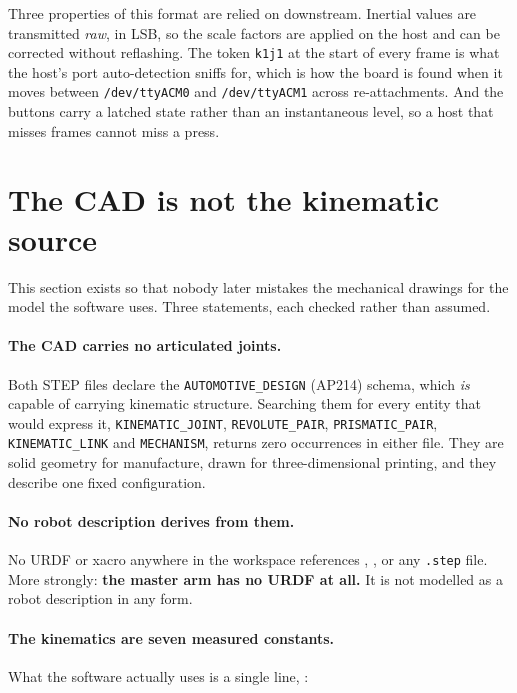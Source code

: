 Three properties of this format are relied on downstream. Inertial values are
transmitted \emph{raw}, in LSB, so the scale factors are applied on the host
and can be corrected without reflashing. The token \texttt{k1j1} at the start
of every frame is what the host's port auto-detection sniffs for, which is how
the board is found when it moves between \texttt{/dev/ttyACM0} and
\texttt{/dev/ttyACM1} across re-attachments. And the buttons carry a latched
state rather than an instantaneous level, so a host that misses frames cannot
miss a press.


\section{The CAD is not the kinematic source}
\label{sec:cad-not-kinematic}

This section exists so that nobody later mistakes the mechanical drawings for
the model the software uses. Three statements, each checked rather than
assumed.

\paragraph{The CAD carries no articulated joints.} Both STEP files declare the
\texttt{AUTOMOTIVE\_DESIGN} (AP214) schema, which \emph{is} capable of
carrying kinematic structure. Searching them for every entity that would
express it, \texttt{KINEMATIC\_JOINT}, \texttt{REVOLUTE\_PAIR},
\texttt{PRISMATIC\_PAIR}, \texttt{KINEMATIC\_LINK} and \texttt{MECHANISM},
returns zero occurrences in either file. They are solid geometry for
manufacture, drawn for three-dimensional printing, and they describe one fixed
configuration.

\paragraph{No robot description derives from them.} No URDF or xacro anywhere
in the workspace references , , or any
\texttt{.step} file. More strongly: \textbf{the master arm has no URDF at
all.} It is not modelled as a robot description in any form.

\paragraph{The kinematics are seven measured constants.} What the software
actually uses is a single line,
:

